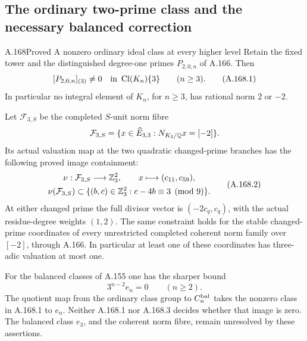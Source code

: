 \subsection{The ordinary two-prime class and the necessary balanced correction}

\begin{statement}{A.168}{Proved}
{A nonzero ordinary ideal class at every higher level}
Retain the fixed tower and the distinguished degree-one primes
\(P_{2,0,n}\) of A.166.  Then
\[
             [P_{2,0,n}]_{(3)}\ne0
                  \quad\hbox{in }\operatorname{Cl}(K_n)\{3\}
                  \qquad(n\geq3).
\tag{A.168.1}
\]
In particular no integral element of \(K_n\), for \(n\geq3\),
has rational norm \(2\) or \(-2\).

Let \(\mathcal F_{3,S}\) be the completed \(S\)-unit norm fibre
\[
 \mathcal F_{3,S}=\{x\in\widehat E_{3,3}:
                                  N_{K_3/\mathbb Q}x=[-2]\}.
\]
Its actual valuation map at the two quadratic changed-prime branches
has the following proved image containment:
\[
 \begin{gathered}
 \nu:\mathcal F_{3,S}\longrightarrow\mathbb Z_3^2,
       \qquad x\longmapsto(c_{11},c_{59}),\\
 \nu(\mathcal F_{3,S})\subset
       \{(b,c)\in\mathbb Z_3^2:c-4b\equiv3\pmod9\}.
 \end{gathered}
\tag{A.168.2}
\]
At either changed prime the full divisor vector is
\((-2c_q,c_q)\), with the actual residue-degree weights \((1,2)\).
The same constraint holds for the stable changed-prime coordinates
of every unrestricted completed coherent norm family over \([-2]\),
through A.166.  In particular at least one of these coordinates
has three-adic valuation at most one.

For the balanced classes of A.155 one has the sharper bound
\[
                         3^{n-2}e_n=0\qquad(n\geq2).
\tag{A.168.3}
\]
The quotient map from the ordinary class group to
\(C_n^{\rm bal}\) takes the nonzero class in A.168.1 to \(e_n\).
Neither A.168.1 nor A.168.3 decides whether that image is zero.
The balanced class \(e_3\), and the coherent norm fibre, remain
unresolved by these assertions.
\end{statement}

